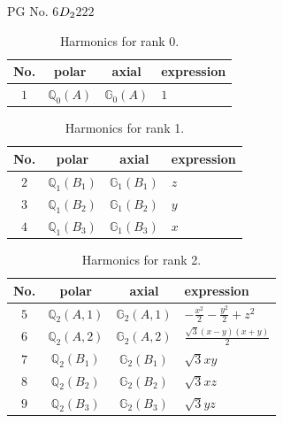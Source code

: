 \documentclass[fleqn,8pt,landscape]{jsarticle}
\begin{document}
\setcounter{MaxMatrixCols}{32}

\renewcommand{\tablename}{Table~}
\renewcommand{\figurename}{Figure~}
\begin{center}
\LARGE
PG No. 6\quad$D_{\rm 2}$\quad$222$\quad[ orthorhombic ]
\end{center}
\begin{table}[ht!]
\begin{center}
\caption{Harmonics for rank 0.}
\renewcommand{\arraystretch}{1.3}
\begin{tabular}{cccl} \hline \hline
No. & polar & axial & expression \\ \hline
$ 1 $ & $ \mathbb{Q}_{0}(A) $ & $ \mathbb{G}_{0}(A) $ & $ 1 $ \\
 \hline \hline
\end{tabular}
\end{center}
\end{table}
\begin{table}[ht!]
\begin{center}
\caption{Harmonics for rank 1.}
\renewcommand{\arraystretch}{1.3}
\begin{tabular}{cccl} \hline \hline
No. & polar & axial & expression \\ \hline
$ 2 $ & $ \mathbb{Q}_{1}(B_{1}) $ & $ \mathbb{G}_{1}(B_{1}) $ & $ z $ \\
$ 3 $ & $ \mathbb{Q}_{1}(B_{2}) $ & $ \mathbb{G}_{1}(B_{2}) $ & $ y $ \\
$ 4 $ & $ \mathbb{Q}_{1}(B_{3}) $ & $ \mathbb{G}_{1}(B_{3}) $ & $ x $ \\
 \hline \hline
\end{tabular}
\end{center}
\end{table}
\begin{table}[ht!]
\begin{center}
\caption{Harmonics for rank 2.}
\renewcommand{\arraystretch}{1.3}
\begin{tabular}{cccl} \hline \hline
No. & polar & axial & expression \\ \hline
$ 5 $ & $ \mathbb{Q}_{2}(A,1) $ & $ \mathbb{G}_{2}(A,1) $ & $ - \frac{x^{2}}{2} - \frac{y^{2}}{2} + z^{2} $ \\
$ 6 $ & $ \mathbb{Q}_{2}(A,2) $ & $ \mathbb{G}_{2}(A,2) $ & $ \frac{\sqrt{3} \left(x - y\right) \left(x + y\right)}{2} $ \\
$ 7 $ & $ \mathbb{Q}_{2}(B_{1}) $ & $ \mathbb{G}_{2}(B_{1}) $ & $ \sqrt{3} x y $ \\
$ 8 $ & $ \mathbb{Q}_{2}(B_{2}) $ & $ \mathbb{G}_{2}(B_{2}) $ & $ \sqrt{3} x z $ \\
$ 9 $ & $ \mathbb{Q}_{2}(B_{3}) $ & $ \mathbb{G}_{2}(B_{3}) $ & $ \sqrt{3} y z $ \\
 \hline \hline
\end{tabular}
\end{center}
\end{table}
\end{document}

